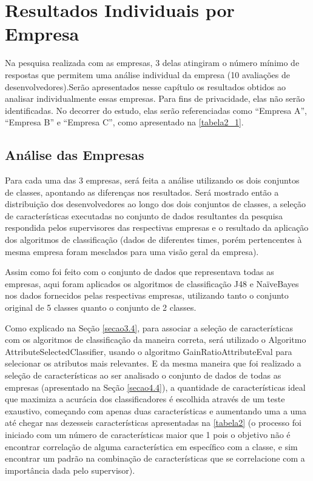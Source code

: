 \chapter[Resultados Individuais por Empresa]{Resultados Individuais por Empresa}

Na pesquisa realizada com as empresas, 3 delas atingiram o número mínimo de respostas que permitem uma análise individual da empresa (10 avaliações de desenvolvedores).Serão apresentados nesse capítulo os resultados obtidos ao analisar individualmente essas empresas. Para fins de privacidade, elas não serão identificadas. No decorrer do estudo, elas serão referenciadas como “Empresa A”, “Empresa B” e “Empresa C”, como apresentado na \ref{tabela2_1}.

\section{Análise das Empresas}

Para cada uma das 3 empresas, será feita a análise utilizando os dois conjuntos de classes, apontando as diferenças nos resultados. Será mostrado então a distribuição dos desenvolvedores ao longo dos dois conjuntos de classes, a seleção de características executadas no conjunto de dados resultantes da pesquisa respondida pelos supervisores das respectivas empresas e o resultado da aplicação dos algoritmos de classificação (dados de diferentes times, porém pertencentes à mesma empresa foram mesclados para uma visão geral da empresa).

Assim como foi feito com o conjunto de dados que representava todas as empresas, aqui foram aplicados os algoritmos de classificação J48 e NaïveBayes nos dados fornecidos pelas respectivas empresas, utilizando tanto o conjunto original de 5 classes quanto o conjunto de 2 classes. 

Como explicado na Seção \ref{secao3.4}, para associar a seleção de características com os algoritmos de classificação da maneira correta, será utilizado o Algoritmo AttributeSelectedClassifier, usando o algoritmo GainRatioAttributeEval para selecionar os atributos mais relevantes. E da mesma maneira que foi realizado a seleção de características ao ser analisado o conjunto de dados de todas as empresas (apresentado na Seção \ref{secao4.4}), a quantidade de características ideal que maximiza a acurácia dos classificadores é escolhida através de um teste exaustivo, começando com apenas duas características e aumentando uma a uma até chegar nas dezesseis características apresentadas na \autoref{tabela2} (o processo foi iniciado com um número de características maior que 1 pois o objetivo não é encontrar correlação de alguma característica em específico com a classe, e sim encontrar um padrão na combinação de características que se correlacione com a importância dada pelo supervisor).


